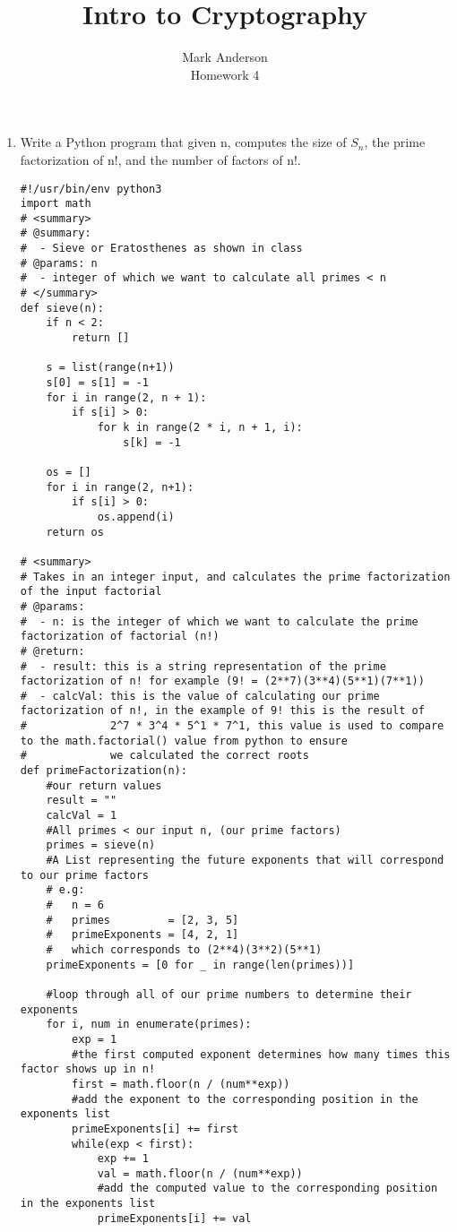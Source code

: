 \documentclass[12pt]{article}
\begin{document}
 
\title{Intro to Cryptography} 
\author{Mark Anderson\\ 
Homework 4} 
 
\maketitle
\begin{enumerate}
  \item Write a Python program that given n, computes the size of $ S_n$, the prime factorization of n!, and the number of factors of n!.
    \begin{lstlisting}
#!/usr/bin/env python3
import math
# <summary>
# @summary:
#  - Sieve or Eratosthenes as shown in class
# @params: n
#  - integer of which we want to calculate all primes < n
# </summary>
def sieve(n):
    if n < 2:
        return []

    s = list(range(n+1))
    s[0] = s[1] = -1
    for i in range(2, n + 1):
        if s[i] > 0:
            for k in range(2 * i, n + 1, i):
                s[k] = -1

    os = []
    for i in range(2, n+1):
        if s[i] > 0:
            os.append(i)
    return os

# <summary>
# Takes in an integer input, and calculates the prime factorization of the input factorial
# @params:
#  - n: is the integer of which we want to calculate the prime factorization of factorial (n!)
# @return:
#  - result: this is a string representation of the prime factorization of n! for example (9! = (2**7)(3**4)(5**1)(7**1))
#  - calcVal: this is the value of calculating our prime factorization of n!, in the example of 9! this is the result of
#             2^7 * 3^4 * 5^1 * 7^1, this value is used to compare to the math.factorial() value from python to ensure
#             we calculated the correct roots 
def primeFactorization(n):
    #our return values
    result = ""
    calcVal = 1
    #All primes < our input n, (our prime factors)
    primes = sieve(n)
    #A List representing the future exponents that will correspond to our prime factors
    # e.g:
    #   n = 6
    #   primes         = [2, 3, 5]
    #   primeExponents = [4, 2, 1]
    #   which corresponds to (2**4)(3**2)(5**1)
    primeExponents = [0 for _ in range(len(primes))]

    #loop through all of our prime numbers to determine their exponents
    for i, num in enumerate(primes):
        exp = 1
        #the first computed exponent determines how many times this factor shows up in n!
        first = math.floor(n / (num**exp))
        #add the exponent to the corresponding position in the exponents list
        primeExponents[i] += first
        while(exp < first):
            exp += 1
            val = math.floor(n / (num**exp))
            #add the computed value to the corresponding position in the exponents list
            primeExponents[i] += val
    

\end{lstlisting}
\end{enumerate}
\end{document}
